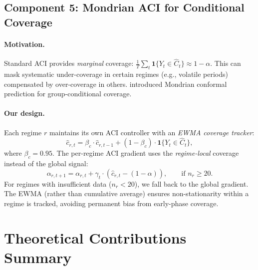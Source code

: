 \subsection{Component 5: Mondrian ACI for Conditional Coverage}
\label{sec:mondrian}

\paragraph{Motivation.}
Standard ACI provides \emph{marginal} coverage: $\frac{1}{T}\sum_t
\mathbf{1}\{Y_t\in\hat{C}_t\} \approx 1-\alpha$.  This can mask
systematic under-coverage in certain regimes (e.g., volatile periods)
compensated by over-coverage in others.  \citet{vovk2005algorithmic}
introduced Mondrian conformal prediction for group-conditional coverage.

\paragraph{Our design.}
Each regime $r$ maintains its own ACI controller with an \emph{EWMA
coverage tracker}:
\begin{equation}\label{eq:ewma-cov}
  \hat{c}_{r,t} = \beta_c \cdot \hat{c}_{r,t-1}
    + (1-\beta_c)\cdot\mathbf{1}\{Y_t\in\hat{C}_t\},
\end{equation}
where $\beta_c = 0.95$.  The per-regime ACI gradient uses the
\emph{regime-local} coverage instead of the global signal:
\begin{equation}\label{eq:mondrian-grad}
  \alpha_{r,t+1} = \alpha_{r,t} + \gamma_t \cdot
    (\hat{c}_{r,t} - (1-\alpha)),
  \qquad \text{if } n_r \ge 20.
\end{equation}
For regimes with insufficient data ($n_r < 20$), we fall back to the
global gradient.  The EWMA (rather than cumulative average) ensures
non-stationarity within a regime is tracked, avoiding permanent bias from
early-phase coverage.

\section{Theoretical Contributions Summary}\label{sec:theory-summary}

